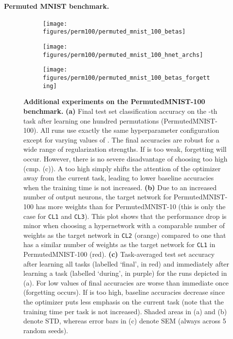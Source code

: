 \documentclass{article}
\begin{document}
\paragraph{Permuted MNIST benchmark.}

\begin{figure}
    \centering
    \begin{subfigure}{0.49\linewidth}
    \caption{}
    \texttt{[image: figures/perm100/permuted\_mnist\_100\_betas]}
    \end{subfigure}
    \begin{subfigure}{0.49\linewidth}
    \caption{}
    \texttt{[image: figures/perm100/permuted\_mnist\_100\_hnet\_archs]}
    \end{subfigure}
    
    \begin{subfigure}{0.49\linewidth}
    \caption{}
    \texttt{[image: figures/perm100/permuted\_mnist\_100\_betas\_forgetting]}
    \end{subfigure}
    \caption{\textbf{Additional experiments on the PermutedMNIST-100 benchmark.} \textbf{(a)} Final test set classification accuracy on the -th task after learning one hundred permutations (PermutedMNIST-100). All runs use exactly the same hyperparameter configuration except for varying values of . The final accuracies are robust for a wide range of regularization strengths. If  is too weak, forgetting will occur. However, there is no severe disadvantage of choosing  too high (cmp. (c)). A too high  simply shifts the attention of the optimizer away from the current task, leading to lower baseline accuracies when the training time is not increased. \textbf{(b)} Due to an increased number of output neurons, the target network for PermutedMNIST-100 has more weights than for PermutedMNIST-10 (this is only the case for \texttt{CL1} and \texttt{CL3}). This plot shows that the performance drop is minor when choosing a hypernetwork with a comparable number of weights as the target network in \texttt{CL2} (orange) compared to one that has a similar number of weights as the target network for  \texttt{CL1} in PermutedMNIST-100 (red). \textbf{(c)}  Task-averaged test set accuracy after learning all tasks (labelled `final', in red) and immediately after learning a task (labelled `during', in purple) for the runs depicted in (a). For low values of  final accuracies are worse than immediate once (forgetting occurs). If  is too high, baseline accuracies decrease since the optimizer puts less emphasis on the current task (note that the training time per task is not increased).
    Shaded areas in (a) and (b) denote STD, whereas error bars in (c) denote SEM (always across 5 random seeds).\label{fig:sm:permutedMNIST100}}
\end{figure}
\end{document}
